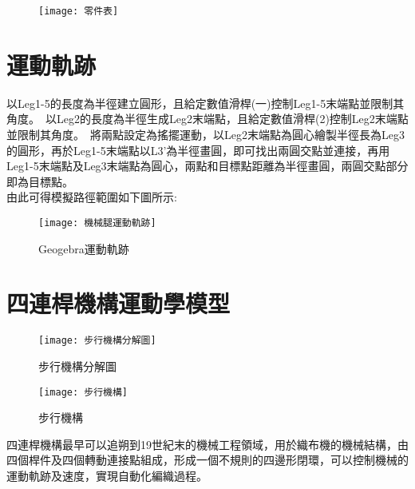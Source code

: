 \begin{figure}[hbt!]
\begin{center}
\texttt{[image: 零件表]}
\label{零件表}
\end{center}
\end{figure}
\newpage


\section{運動軌跡}
以Leg1-5的長度為半徑建立圓形，且給定數值滑桿(一)控制Leg1-5末端點並限制其角度。\
以Leg2的長度為半徑生成Leg2末端點，且給定數值滑桿(2)控制Leg2末端點並限制其角度。\
將兩點設定為搖擺運動，以Leg2末端點為圓心繪製半徑長為Leg3的圓形，再於Leg1-5末端點以L3’為半徑畫圓，即可找出兩圓交點並連接，再用Leg1-5末端點及Leg3末端點為圓心，兩點和目標點距離為半徑畫圓，兩圓交點部分即為目標點。\\

由此可得模擬路徑範圍如下圖所示:\\
\begin{figure}[hbt!]
\begin{center}
\texttt{[image: 機械腿運動軌跡]}
\caption{\Large Geogebra運動軌跡}\label{機械腿運動軌跡}
\end{center}
\end{figure}

\newpage

\section{四連桿機構運動學模型}

\begin{figure}[htbp]
  \begin{minipage}[t]{0.5\linewidth}
    \centering
    \texttt{[image: 步行機構分解圖]}
    \caption{步行機構分解圖}
    \label{步行機構分解圖}
  \end{minipage}
  \hfill
  \begin{minipage}[t]{0.4\linewidth}
    \centering
    \texttt{[image: 步行機構]}
    \caption{步行機構}
    \label{步行機構}
  \end{minipage}
\end{figure}

四連桿機構最早可以追朔到19世紀末的機械工程領域，用於織布機的機械結構，由四個桿件及四個轉動連接點組成，形成一個不規則的四邊形閉環，可以控制機械的運動軌跡及速度，實現自動化編織過程。\\

